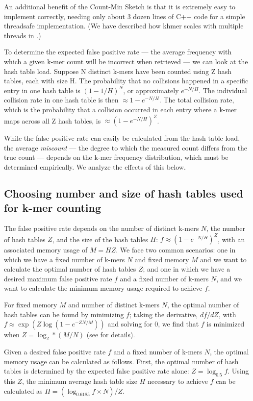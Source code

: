 \documentclass[10pt]{article}
\begin{document}
An additional benefit of the Count-Min Sketch is that it is extremely
easy to implement correctly, needing only about 3 dozen lines of C++
code for a simple threadsafe implementation.  (We have
described how khmer scales with multiple threads in
\cite{McDonald2013}.)

To determine the expected false positive rate --- the average frequency with
which a given k-mer count will be incorrect when retrieved --- we can
look at the hash table load. Suppose N distinct k-mers have been counted
using Z hash tables, each with size H.  The probability that no
collisions happened in a specific entry in one hash table is
$(1-1/H)^{N}$, or approximately $e^{-N/H}$. The individual collision
rate in one hash table is then $\approx 1-e^{-N/H}$. The total
collision rate, which is the probability that a collision occurred in
each entry where a k-mer maps across all Z hash tables, is $\approx
(1-e^{-N/H})^{Z}$.

While the false positive rate can easily be calculated from the hash table
load, the average {\em miscount} --- the degree to which the measured
count differs from the true count --- depends on the k-mer frequency
distribution, which must be determined empirically.  We analyze the
effects of this below.


\subsection*{Choosing number and size of hash tables used for k-mer counting}

The false positive rate depends on the number of distinct k-mers $N$,
the number of hash tables $Z$, and the size of the hash tables $H$: $f
\approx (1-e^{-N/H})^{Z}$, with an associated memory usage of $M = H
Z$.  We face two common scenarios: one in which we have a fixed number
of k-mers $N$ and fixed memory $M$ and we want to calculate the
optimal number of hash tables $Z$; and one in which we have a desired
maximum false positive rate $f$ and a fixed number of k-mers $N$, and
we want to calculate the minimum memory usage required to achieve $f$.

For fixed memory $M$ and number of distinct k-mers $N$, the optimal
number of hash tables can be found by minimizing $f$; taking the
derivative, $df/dZ$, with $f \approx \exp(Z \log(1-e^{-ZN/M}))$ and solving
for 0, we find that $f$ is minimized when $Z=\log_2*(M/N)$ (see
\cite{broder2004network} for details).

Given a desired false positive rate $f$ and a fixed number of k-mers
$N$, the optimal memory usage can be calculated as follows.  First,
the optimal number of hash tables is determined by the expected false
positive rate alone: $Z = \log_{0.5}f$.  Using this $Z$, the minimum
average hash table size $H$ necessary to achieve $f$ can be calculated
as $H = (\log_{0.6185}f\times N)/Z$.
\end{document}
